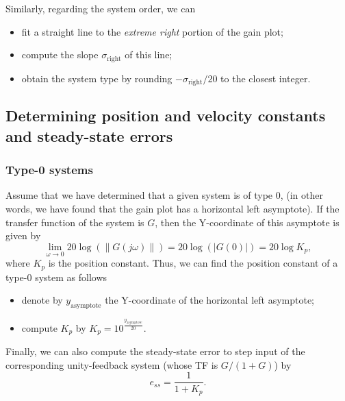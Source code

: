 \documentclass[a4paper,11pt]{report}
\theoremstyle{definition}
\begin{document}
Similarly, regarding the system order, we can
\begin{itemize}
\item fit a straight line to the \emph{extreme right} portion of the
  gain plot;
\item compute the slope $\sigma_\mathrm{right}$ of this line;
\item obtain the system type by rounding $-\sigma_\mathrm{right}/20$
  to the closest integer.
\end{itemize}

\subsection{Determining position and velocity constants and steady-state
  errors}
\label{sec:errors}

\subsubsection{Type-0 systems}

Assume that we have determined that a given system is of type 0, (in
other words, we have found that the gain plot has a horizontal left
asymptote). If the transfer function of the system is $G$, then the
Y-coordinate of this asymptote is given by
\[
\lim_{\omega\to 0} 20\log(\|G(j\omega)\|) = 20\log(|G(0)|) = 20\log K_p,
\]
where $K_p$ is the position constant. Thus, we can find the position
constant of a type-0 system as follows
\begin{itemize}
\item denote by $y_\mathrm{asymptote}$ the Y-coordinate of the horizontal
  left asymptote;
\item compute $K_p$ by $K_p = 10^{\frac{y_\mathrm{asymptote}}{20}}$.
\end{itemize}

Finally, we can also compute the steady-state error to step input of
the corresponding unity-feedback system (whose TF is $G/(1+G)$) by
\[
e_{ss} = \frac{1}{1+K_p}.
\]
\end{document}
